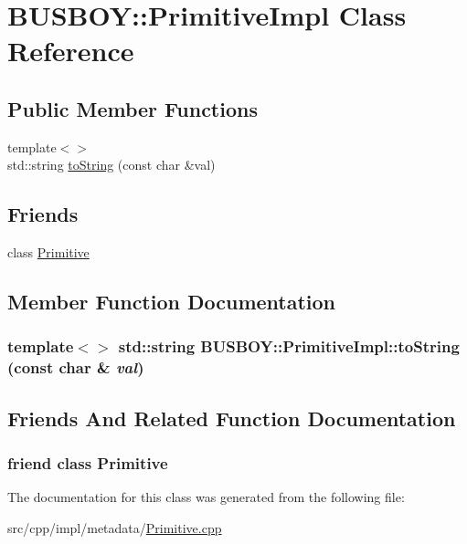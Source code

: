 \hypertarget{classBUSBOY_1_1PrimitiveImpl}{
\section{BUSBOY::PrimitiveImpl Class Reference}
\label{classBUSBOY_1_1PrimitiveImpl}
}
\subsection*{Public Member Functions}
\begin{DoxyCompactItemize}
\item 
{\footnotesize template$<$$>$ }\\std::string \hyperlink{classBUSBOY_1_1PrimitiveImpl_a4be672051da8b63dbb8e961edd38498d}{toString} (const char \&val)
\end{DoxyCompactItemize}
\subsection*{Friends}
\begin{DoxyCompactItemize}
\item 
class \hyperlink{classBUSBOY_1_1PrimitiveImpl_a6a4d7daa0ec1975b98cf7599de187e02}{Primitive}
\end{DoxyCompactItemize}


\subsection{Member Function Documentation}
\hypertarget{classBUSBOY_1_1PrimitiveImpl_a4be672051da8b63dbb8e961edd38498d}{
\subsubsection[{toString}]{\setlength{\rightskip}{0pt plus 5cm}template$<$$>$ std::string BUSBOY::PrimitiveImpl::toString (const char \& {\em val})}}
\label{classBUSBOY_1_1PrimitiveImpl_a4be672051da8b63dbb8e961edd38498d}


\subsection{Friends And Related Function Documentation}
\hypertarget{classBUSBOY_1_1PrimitiveImpl_a6a4d7daa0ec1975b98cf7599de187e02}{
\subsubsection[{Primitive}]{\setlength{\rightskip}{0pt plus 5cm}friend class {\bf Primitive}}}
\label{classBUSBOY_1_1PrimitiveImpl_a6a4d7daa0ec1975b98cf7599de187e02}


The documentation for this class was generated from the following file:\begin{DoxyCompactItemize}
\item 
src/cpp/impl/metadata/\hyperlink{Primitive_8cpp}{Primitive.cpp}\end{DoxyCompactItemize}
